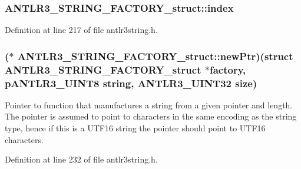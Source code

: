 \hypertarget{struct_a_n_t_l_r3___s_t_r_i_n_g___f_a_c_t_o_r_y__struct_a489bb691b135213bfc2141c5266f7891}{
\subsubsection[{index}]{ A\-N\-T\-L\-R3\-\_\-\-S\-T\-R\-I\-N\-G\-\_\-\-F\-A\-C\-T\-O\-R\-Y\-\_\-struct\-::index}}\label{struct_a_n_t_l_r3___s_t_r_i_n_g___f_a_c_t_o_r_y__struct_a489bb691b135213bfc2141c5266f7891}


Definition at line 217 of file antlr3string.\-h.

\hypertarget{struct_a_n_t_l_r3___s_t_r_i_n_g___f_a_c_t_o_r_y__struct_a6cb6566b577eb18979692b1f999f6a0c}{
\subsubsection[{new\-Ptr}]{($\ast$ A\-N\-T\-L\-R3\-\_\-\-S\-T\-R\-I\-N\-G\-\_\-\-F\-A\-C\-T\-O\-R\-Y\-\_\-struct\-::new\-Ptr)(struct {\bf A\-N\-T\-L\-R3\-\_\-\-S\-T\-R\-I\-N\-G\-\_\-\-F\-A\-C\-T\-O\-R\-Y\-\_\-struct} $\ast$factory, {\bf p\-A\-N\-T\-L\-R3\-\_\-\-U\-I\-N\-T8} string, {\bf A\-N\-T\-L\-R3\-\_\-\-U\-I\-N\-T32} {\bf size})}}\label{struct_a_n_t_l_r3___s_t_r_i_n_g___f_a_c_t_o_r_y__struct_a6cb6566b577eb18979692b1f999f6a0c}
Pointer to function that manufactures a string from a given pointer and length. The pointer is assumed to point to characters in the same encoding as the string type, hence if this is a U\-T\-F16 string the pointer should point to U\-T\-F16 characters. 

Definition at line 232 of file antlr3string.\-h.

